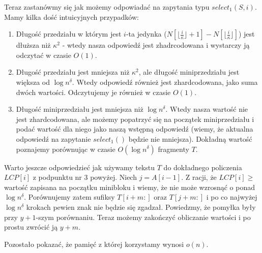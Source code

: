 \documentclass{article}
\begin{document}



Teraz zastanówmy się jak możemy odpowiadać na zapytania typu $select_1(S, i)$. Mamy kilka dość intuicyjnych przypadków:

\begin{enumerate}
    \item Długość przedziału w którym jest $i$-ta jedynka ($N[\lfloor \frac{i}{\kappa} \rfloor + 1] - N[\lfloor \frac{i}{\kappa} \rfloor]$) jest dłuższa niż $\kappa^2$ - wtedy nasza odpowiedź jest zhadrcodowana i wystarczy ją odczytać w czasie $O(1)$.
    \item Długość przedziału jest mniejsza niż $\kappa^2$, ale długość miniprzedziału jest większa od $\log{n}^{\delta}$. Wtedy odpowiedź również jest zhardcodowana, jako suma dwóch wartości. Odczytujemy je również w czasie $O(1)$.
    \item Długość miniprzedziału jest mniejsza niż $\log{n}^{\delta}$. Wtedy nasza wartość nie jest zhardcodowana, ale możemy popatrzyć się na początek miniprzedziału i podać wartość dla niego jako naszą wstępną odpowiedź (wiemy, że aktualna odpowiedź na zapytanie $select_1()$ będzie nie mniejsza). Dokładną wartość poznajemy porównując w czasie $O(\log{n}^{\delta})$ fragmenty $T$.
\end{enumerate}

Warto jeszcze odpowiedzieć jak używamy tekstu $T$ do dokładnego policzenia $LCP[i]$ z podpunktu nr 3 powyżej. Niech $j = A[i-1]$. Z racji, że $LCP[i] \ge$ wartość zapisana na początku minibloku i wiemy, że nie może wzrosnąć o ponad $\log{n}^{\delta}$. Porównujemy zatem sufiksy $T[i+m:]$ oraz $T[j+m:]$ i po co najwyżej $\log{n}^{\delta}$ krokach pewien znak nie będzie się zgadzał. Powiedzmy, że pomyłka były przy $y+1$-szym porównaniu. Teraz możemy zakończyć obliczanie wartości i po prostu zwrócić ją $y+m$.

Pozostało pokazać, że pamięć z której korzystamy wynosi $o(n)$.
\end{document}
